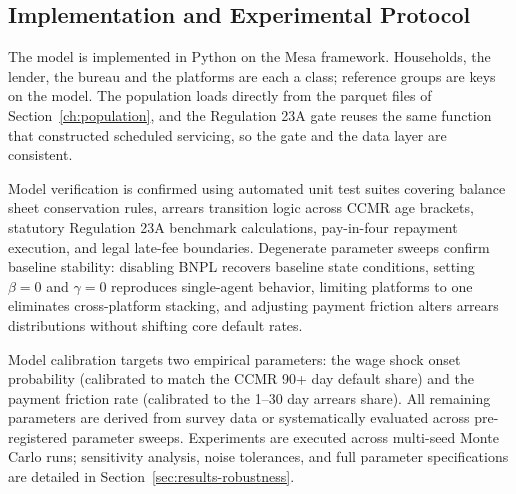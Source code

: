 \subsection{Implementation and Experimental Protocol}
\label{sec:implementation}

The model is implemented in Python on the Mesa framework.
Households, the lender, the bureau and the platforms are each a class; reference groups are keys
on the model.
The population loads directly from the parquet files of
Section~\ref{ch:population}, and the Regulation 23A gate reuses the same function that
constructed scheduled servicing, so the gate and the data layer are consistent.

Model verification is confirmed using automated unit test suites covering balance sheet conservation rules, arrears transition logic across \ac{CCMR} age brackets, statutory Regulation 23A benchmark calculations, pay-in-four repayment execution, and legal late-fee boundaries.
Degenerate parameter sweeps confirm baseline stability: disabling \ac{BNPL} recovers baseline state conditions, setting $\beta = 0$ and $\gamma = 0$ reproduces single-agent behavior, limiting platforms to one eliminates cross-platform stacking, and adjusting payment friction alters arrears distributions without shifting core default rates.

Model calibration targets two empirical parameters: the wage shock onset probability (calibrated to match the \ac{CCMR} 90+ day default share) and the payment friction rate (calibrated to the 1--30 day arrears share).
All remaining parameters are derived from survey data or systematically evaluated across pre-registered parameter sweeps.
Experiments are executed across multi-seed Monte Carlo runs; sensitivity analysis, noise tolerances, and full parameter specifications are detailed in Section~\ref{sec:results-robustness}.

